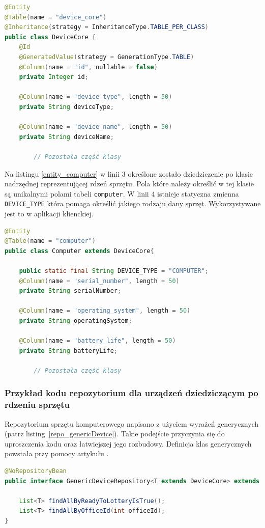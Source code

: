 \begin{lstlisting}[language=Java, style=JavaStyle, caption={Klasa nadrzędna reprezentująca rdzeń sprzętu: \texttt{DeviceCore}}, label={entity_deviceCore}]
@Entity
@Table(name = "device_core")
@Inheritance(strategy = InheritanceType.TABLE_PER_CLASS)
public class DeviceCore {
    @Id
    @GeneratedValue(strategy = GenerationType.TABLE)
    @Column(name = "id", nullable = false)
    private Integer id;

    @Column(name = "device_type", length = 50)
    private String deviceType;

    @Column(name = "device_name", length = 50)
    private String deviceName;
		
		// Pozostała część klasy

\end{lstlisting}

Na listingu \ref{entity_computer} w linii 3 określone zostało dziedziczenie po klasie nadrzędnej reprezentującej rdzeń sprzętu. Pola które należy określić w tej klasie są unikalnymi polami tabeli \texttt{computer}. W linii 4 istnieje statyczna zmienna \texttt{DEVICE\_TYPE} która pomaga określić jakiego rodzaju dany sprzęt. Wykorzystywane jest to w aplikacji klienckiej.

\begin{lstlisting}[language=Java, style=JavaStyle,  caption={Klasa potomna: Computer, reprezentująca komputer}, label={entity_computer}]
@Entity
@Table(name = "computer")
public class Computer extends DeviceCore{

    public static final String DEVICE_TYPE = "COMPUTER";
    @Column(name = "serial_number", length = 50)
    private String serialNumber;

    @Column(name = "operating_system", length = 50)
    private String operatingSystem;

    @Column(name = "battery_life", length = 50)
    private String batteryLife;
		
		// Pozostała część klasy
\end{lstlisting}


\subsubsection{Przykład kodu repozytorium dla urządzeń dziedziczącym po rdzeniu sprzętu}
Repozytorium sprzętu komputerowego napisano z użyciem wyrażeń generycznych (patrz listing~\ref{repo_genericDevice}). Takie podejście przyczynia się do uproszczenia kodu oraz łatwiejszej jego rozbudowy. Definicja klas generycznych powstała przy pomocy artykułu \cite{generics}. 
\begin{lstlisting}[language=Java, style=JavaStyle,  caption={Generyczne repozytorium sprzętu komputerowego:  GenericDeviceRepository}, label={repo_genericDevice}]
@NoRepositoryBean
public interface GenericDeviceRepository<T extends DeviceCore> extends JpaRepository<T, Integer> {
    
    List<T> findAllByReadyToLotteryIsTrue();
    List<T> findAllByOfficeId(int officeId);
}
\end{lstlisting}

